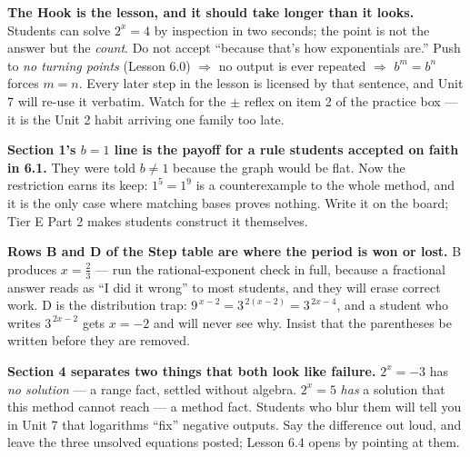 \documentclass[10pt]{article}
\begin{document}
\begin{teachernote}
\textbf{The Hook is the lesson, and it should take longer than it looks.} Students can solve $2^{x}=4$
by inspection in two seconds; the point is not the answer but the \emph{count}. Do not accept ``because
that's how exponentials are.'' Push to \emph{no turning points} (Lesson 6.0) $\Rightarrow$ no output is
ever repeated $\Rightarrow$ $b^{m}=b^{n}$ forces $m=n$. Every later step in the lesson is licensed by
that sentence, and Unit 7 will re-use it verbatim. Watch for the $\pm$ reflex on item 2 of the practice
box --- it is the Unit 2 habit arriving one family too late.

\textbf{Section 1's $b=1$ line is the payoff for a rule students accepted on faith in 6.1.} They were
told $b\neq1$ because the graph would be flat. Now the restriction earns its keep: $1^{5}=1^{9}$ is a
counterexample to the whole method, and it is the only case where matching bases proves nothing. Write
it on the board; Tier E Part 2 makes students construct it themselves.

\textbf{Rows B and D of the Step table are where the period is won or lost.} B produces $x=\frac23$ ---
run the rational-exponent check in full, because a fractional answer reads as ``I did it wrong'' to most
students, and they will erase correct work. D is the distribution trap: $9^{\,x-2}=3^{\,2(x-2)}=3^{\,2x-4}$,
and a student who writes $3^{\,2x-2}$ gets $x=-2$ and will never see why. Insist that the parentheses
be written before they are removed.

\textbf{Section 4 separates two things that both look like failure.} $2^{x}=-3$ has \emph{no solution}
--- a range fact, settled without algebra. $2^{x}=5$ \emph{has} a solution that this method cannot
reach --- a method fact. Students who blur them will tell you in Unit 7 that logarithms ``fix'' negative
outputs. Say the difference out loud, and leave the three unsolved equations posted; Lesson 6.4 opens
by pointing at them.
\end{teachernote}
\end{document}
